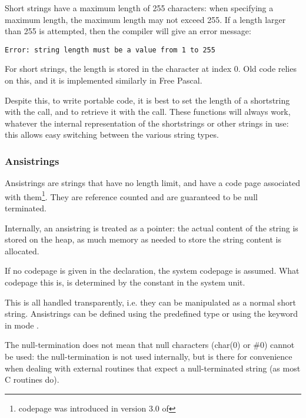 \begin{remark}
Short strings have a maximum length of 255 characters: when specifying a
maximum length, the maximum length may not exceed 255. If a length larger
than 255 is attempted, then the compiler will give an error message:
\begin{verbatim}
Error: string length must be a value from 1 to 255
\end{verbatim}

For short strings, the length is stored in the character at index 0. Old
\tp code relies on this, and it is implemented similarly in Free Pascal. 

Despite this, to write portable code, it is best to set the length of a 
shortstring  with the  call, and to retrieve
it with the  call.  These functions will always work, whatever
the internal representation of the shortstrings or other strings in use:
this allows easy switching between the various string types.
\end{remark}

\subsubsection{Ansistrings}
Ansistrings are strings that have no length limit, and have a code page associated with 
them\footnote{codepage was introduced in version 3.0 of \fpc}. 
They are reference counted and are guaranteed to be null terminated. 

Internally, an ansistring is treated as a pointer: the actual content of the string is stored on the heap, as much
memory as needed to store the string content is allocated. 

If no codepage is given in the declaration, the system codepage is assumed. 
What codepage this is, is determined by the  constant in the system unit.

This is all handled transparently, i.e. they can be manipulated as a normal 
short string. Ansistrings can be defined using the predefined  
type or using the  keyword in mode . 

\begin{remark} 
The null-termination does not mean that null characters (char(0) or \#0) 
cannot be used: the null-termination is not used internally, but is there for
convenience when dealing with external routines that expect a
null-terminated string (as most C routines do).
\end{remark}


